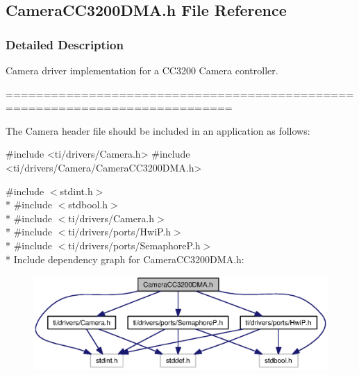 \subsection{Camera\+C\+C3200\+D\+M\+A.\+h File Reference}
\label{_camera_c_c3200_d_m_a_8h}


\subsubsection{Detailed Description}
Camera driver implementation for a C\+C3200 Camera controller. 

============================================================================

The Camera header file should be included in an application as follows\+: 
\begin{DoxyCode}
\textcolor{preprocessor}{#include <ti/drivers/Camera.h>}
\textcolor{preprocessor}{#include <ti/drivers/Camera/CameraCC3200DMA.h>}
\end{DoxyCode}
 

{\ttfamily \#include $<$stdint.\+h$>$}\\*
{\ttfamily \#include $<$stdbool.\+h$>$}\\*
{\ttfamily \#include $<$ti/drivers/\+Camera.\+h$>$}\\*
{\ttfamily \#include $<$ti/drivers/ports/\+Hwi\+P.\+h$>$}\\*
{\ttfamily \#include $<$ti/drivers/ports/\+Semaphore\+P.\+h$>$}\\*
Include dependency graph for Camera\+C\+C3200\+D\+M\+A.\+h\+:
\nopagebreak
\begin{figure}[H]
\begin{center}
\leavevmode
\includegraphics[width=350pt]{_camera_c_c3200_d_m_a_8h__incl}
\end{center}
\end{figure}
